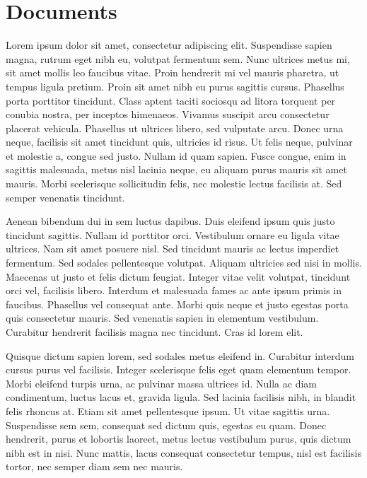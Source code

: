 \chapter{Documents}\label{ch:documents}

Lorem ipsum dolor sit amet, consectetur adipiscing elit. Suspendisse sapien magna, rutrum eget nibh eu, volutpat fermentum sem. Nunc ultrices metus mi, sit amet mollis leo faucibus vitae. Proin hendrerit mi vel mauris pharetra, ut tempus ligula pretium. Proin sit amet nibh eu purus sagittis cursus. Phasellus porta porttitor tincidunt. Class aptent taciti sociosqu ad litora torquent per conubia nostra, per inceptos himenaeos. Vivamus suscipit arcu consectetur placerat vehicula. Phasellus ut ultrices libero, sed vulputate arcu. Donec urna neque, facilisis sit amet tincidunt quis, ultricies id risus. Ut felis neque, pulvinar et molestie a, congue sed justo. Nullam id quam sapien. Fusce congue, enim in sagittis malesuada, metus nisl lacinia neque, eu aliquam purus mauris sit amet mauris. Morbi scelerisque sollicitudin felis, nec molestie lectus facilisis at. Sed semper venenatis tincidunt.


Aenean bibendum dui in sem luctus dapibus. Duis eleifend ipsum quis justo tincidunt sagittis. Nullam id porttitor orci. Vestibulum ornare eu ligula vitae ultrices. Nam sit amet posuere nisl. Sed tincidunt mauris ac lectus imperdiet fermentum. Sed sodales pellentesque volutpat. Aliquam ultricies sed nisi in mollis. Maecenas ut justo et felis dictum feugiat. Integer vitae velit volutpat, tincidunt orci vel, facilisis libero. Interdum et malesuada fames ac ante ipsum primis in faucibus. Phasellus vel consequat ante. Morbi quis neque et justo egestas porta quis consectetur mauris. Sed venenatis sapien in elementum vestibulum. Curabitur hendrerit facilisis magna nec tincidunt. Cras id lorem elit.


Quisque dictum sapien lorem, sed sodales metus eleifend in. Curabitur interdum cursus purus vel facilisis. Integer scelerisque felis eget quam elementum tempor. Morbi eleifend turpis urna, ac pulvinar massa ultrices id. Nulla ac diam condimentum, luctus lacus et, gravida ligula. Sed lacinia facilisis nibh, in blandit felis rhoncus at. Etiam sit amet pellentesque ipsum. Ut vitae sagittis urna. Suspendisse sem sem, consequat sed dictum quis, egestas eu quam. Donec hendrerit, purus et lobortis laoreet, metus lectus vestibulum purus, quis dictum nibh est in nisi. Nunc mattis, lacus consequat consectetur tempus, nisl est facilisis tortor, nec semper diam sem nec mauris.


